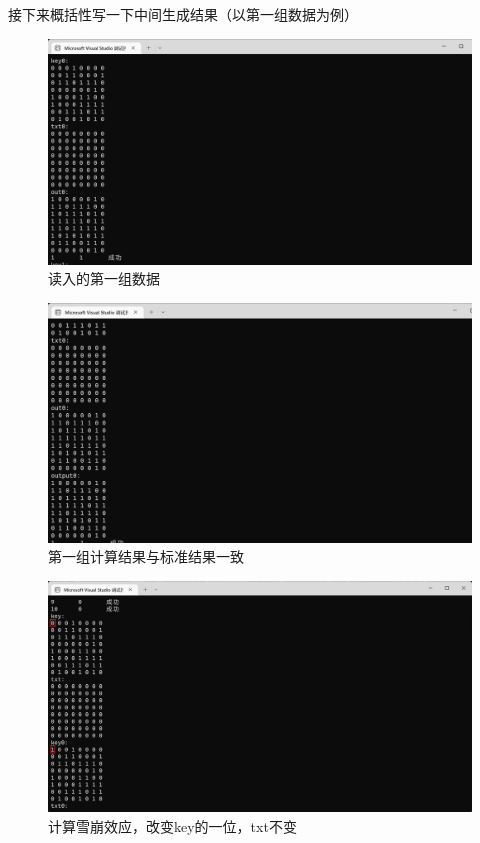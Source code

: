 接下来概括性写一下中间生成结果（以第一组数据为例）\\
\begin{figure}[thbp!]
	\centering
	\includegraphics[height=10 CM]{figure/003}
	\caption{读入的第一组数据}
	\label{fig:读入的第一组数据}
\end{figure}
\begin{figure}[thbp!]
	\centering
	\includegraphics[height=10 CM]{figure/004}
	\caption{第一组计算结果与标准结果一致}
	\label{fig:第一组计算结果与标准结果一致}
\end{figure}
\begin{figure}[thbp!]
	\centering
	\includegraphics[height=10 CM]{figure/005}
	\caption{计算雪崩效应，改变key的一位，txt不变}
	\label{fig:计算雪崩效应，改变key的一位，txt不变}
\end{figure}

